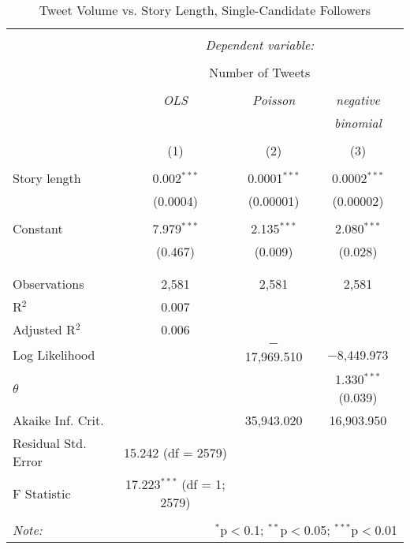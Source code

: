 \begin{table}[!htbp] \centering 
  \caption{Tweet Volume vs. Story Length, Single-Candidate Followers} 
  \label{} 
    \begin{tabular}{@{\extracolsep{5pt}}lccc} 
    \\[-1.8ex]\hline 
    \hline \\[-1.8ex] 
     & \multicolumn{3}{c}{\textit{Dependent variable:}} \\ 
    \cline{2-4} 
    \\[-1.8ex] & \multicolumn{3}{c}{Number of Tweets} \\ 
    \\[-1.8ex] & \textit{OLS} & \textit{Poisson} & \textit{negative} \\ 
     & \textit{} & \textit{} & \textit{binomial} \\ 
    \\[-1.8ex] & (1) & (2) & (3)\\ 
    \hline \\[-1.8ex] 
     Story length & 0.002$^{***}$ & 0.0001$^{***}$ & 0.0002$^{***}$ \\ 
      & (0.0004) & (0.00001) & (0.00002) \\ 
      & & & \\ 
     Constant & 7.979$^{***}$ & 2.135$^{***}$ & 2.080$^{***}$ \\ 
      & (0.467) & (0.009) & (0.028) \\ 
      & & & \\ 
    \hline \\[-1.8ex] 
    Observations & 2,581 & 2,581 & 2,581 \\ 
    R$^{2}$ & 0.007 &  &  \\ 
    Adjusted R$^{2}$ & 0.006 &  &  \\ 
    Log Likelihood &  & $-$17,969.510 & $-$8,449.973 \\ 
    $\theta$ &  &  & 1.330$^{***}$  (0.039) \\ 
    Akaike Inf. Crit. &  & 35,943.020 & 16,903.950 \\ 
    Residual Std. Error & 15.242 (df = 2579) &  &  \\ 
    F Statistic & 17.223$^{***}$ (df = 1; 2579) &  &  \\ 
    \hline 
    \hline \\[-1.8ex] 
    \textit{Note:}  & \multicolumn{3}{r}{$^{*}$p$<$0.1; $^{**}$p$<$0.05; $^{***}$p$<$0.01} \\ 
    \end{tabular} 
\end{table} 

